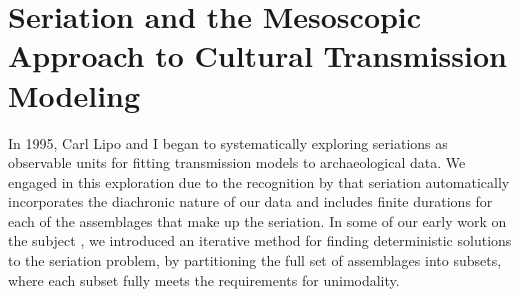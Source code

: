 \section{Seriation and the Mesoscopic Approach to Cultural Transmission Modeling}

In 1995, Carl Lipo and I \citep{huntmadsenlipo1995a,lipomadsenhunt1995b,Lipo1997,Lipo2001neutrality,lipomadsen1997,Lipo2001a,Lipo2001} began to systematically exploring seriations as observable units for fitting transmission models to archaeological data.  We engaged in this exploration due to the recognition by \citet{Dunnell1970} that seriation automatically incorporates the diachronic nature of our data and includes finite durations for each of the assemblages that make up the seriation. In some of our early work on the subject , we introduced an iterative method for finding deterministic solutions to the seriation problem, by partitioning the full set of assemblages into subsets, where each subset fully meets the requirements for unimodality.  


